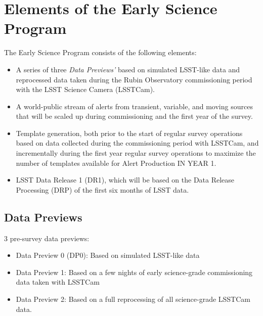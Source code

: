 \section{Elements of the Early Science Program}

The Early Science Program consists of the following elements:
\begin{itemize}
	\item A series of three \emph{Data Previews'} based on simulated LSST-like data and reprocessed data taken during the Rubin Observatory commissioning period with the LSST Science Camera (LSSTCam). 
	\item A world-public stream of alerts from transient, variable, and moving sources that will be scaled up during commissioning and the first year of the survey. 
	\item Template generation, both prior to the start of regular survey operations based on data collected during the commissioning period with LSSTCam, and incrementally during the first year regular survey operations  to maximize the number of templates available for Alert Production IN YEAR 1. 
	\item LSST Data Release 1 (DR1), which will be based on the Data Release Processing (DRP) of the first six months of LSST data.
\end{itemize}

\subsection{Data Previews}

3 pre-survey data previews:
\begin{itemize}
\item  Data Preview 0 (DP0): Based on simulated LSST-like data
\item  Data Preview 1: Based on a few nights of early science-grade commissioning data taken with LSSTCam 
\item Data Preview 2: Based on a full reprocessing of all science-grade LSSTCam data.

\end{itemize}

